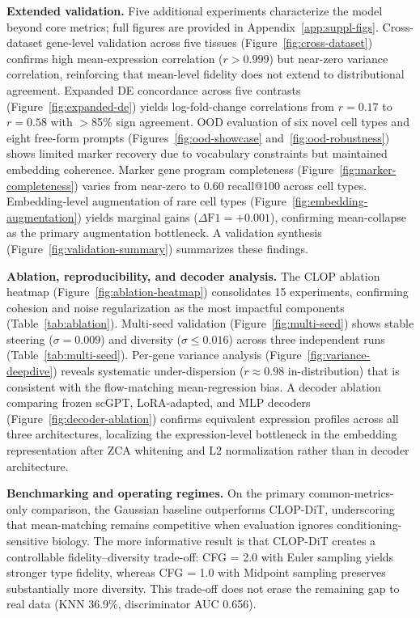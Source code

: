 \documentclass[genes,article,submit,pdftex,oneauthor]{Definitions/mdpi}
\begin{document}
\textbf{Extended validation.} Five additional experiments characterize the model beyond core metrics; full figures are provided in Appendix~\ref{app:suppl-figs}. Cross-dataset gene-level validation across five tissues (Figure~\ref{fig:cross-dataset}) confirms high mean-expression correlation ($r > 0.999$) but near-zero variance correlation, reinforcing that mean-level fidelity does not extend to distributional agreement. Expanded DE concordance across five contrasts (Figure~\ref{fig:expanded-de}) yields log-fold-change correlations from $r = 0.17$ to $r = 0.58$ with $>$85\% sign agreement. OOD evaluation of six novel cell types and eight free-form prompts (Figures~\ref{fig:ood-showcase} and~\ref{fig:ood-robustness}) shows limited marker recovery due to vocabulary constraints but maintained embedding coherence. Marker gene program completeness (Figure~\ref{fig:marker-completeness}) varies from near-zero to 0.60 recall@100 across cell types. Embedding-level augmentation of rare cell types (Figure~\ref{fig:embedding-augmentation}) yields marginal gains ($\Delta\text{F1} = +0.001$), confirming mean-collapse as the primary augmentation bottleneck. A validation synthesis (Figure~\ref{fig:validation-summary}) summarizes these findings.

\textbf{Ablation, reproducibility, and decoder analysis.} The CLOP ablation heatmap (Figure~\ref{fig:ablation-heatmap}) consolidates 15 experiments, confirming cohesion and noise regularization as the most impactful components (Table~\ref{tab:ablation}). Multi-seed validation (Figure~\ref{fig:multi-seed}) shows stable steering ($\sigma = 0.009$) and diversity ($\sigma \leq 0.016$) across three independent runs (Table~\ref{tab:multi-seed}). Per-gene variance analysis (Figure~\ref{fig:variance-deepdive}) reveals systematic under-dispersion ($r \approx 0.98$ in-distribution) that is consistent with the flow-matching mean-regression bias. A decoder ablation comparing frozen scGPT, LoRA-adapted, and MLP decoders (Figure~\ref{fig:decoder-ablation}) confirms equivalent expression profiles across all three architectures, localizing the expression-level bottleneck in the embedding representation after ZCA whitening and L2 normalization rather than in decoder architecture.

\textbf{Benchmarking and operating regimes.} On the primary common-metrics-only comparison, the Gaussian baseline outperforms CLOP-DiT, underscoring that mean-matching remains competitive when evaluation ignores conditioning-sensitive biology. The more informative result is that CLOP-DiT creates a controllable fidelity--diversity trade-off: CFG = 2.0 with Euler sampling yields stronger type fidelity, whereas CFG = 1.0 with Midpoint sampling preserves substantially more diversity. This trade-off does not erase the remaining gap to real data (KNN 36.9\%, discriminator AUC 0.656).
\end{document}
